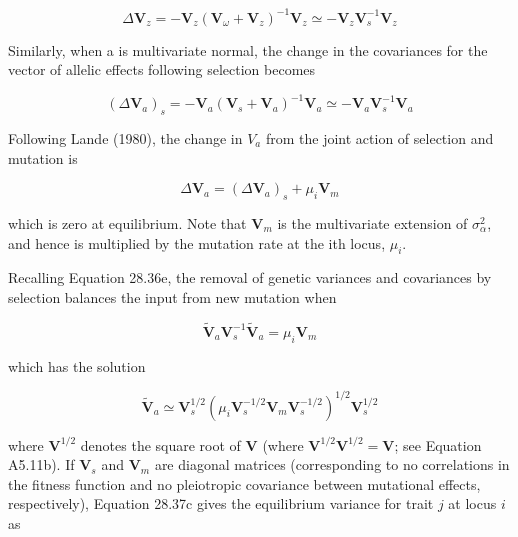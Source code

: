 \documentclass{article}
\begin{document}
\begin{equation}
\Delta\mathbf{V}_{z}=-\mathbf{V}_{z}(\mathbf{V}_{\omega}+\mathbf{V}_{z})^{-1}\mathbf{V}_{z}\simeq-\mathbf{V}_{z}\mathbf{V}_{s}^{-1}\mathbf{V}_{z}
\tag{28.36d}
\label{eq:28_36d}
\end{equation}

Similarly, when a is multivariate normal, the change in the covariances for the vector of allelic effects following selection becomes

\begin{equation}
\left(\Delta\mathbf{V}_{a}\right)_{s}=-\mathbf{V}_{a}\left(\mathbf{V}_{s}+\mathbf{V}_{a}\right)^{-1}\mathbf{V}_{a}\simeq-\mathbf{V}_{a}\mathbf{V}_{s}^{-1}\mathbf{V}_{a}
\tag{28.36e}
\label{eq:28_36e}
\end{equation}

Following Lande (1980), the change in  $ V_{a} $ from the joint action of selection and mutation is

\begin{equation}
\Delta\mathbf{V}_{a}=\left(\Delta\mathbf{V}_{a}\right)_{s}+\mu_{i}\mathbf{V}_{m}
\tag{28.37a}
\label{eq:28_37a}
\end{equation}

which is zero at equilibrium. Note that  $ \mathbf{V}_{m} $ is the multivariate extension of  $ \sigma_{\alpha}^{2} $, and hence is multiplied by the mutation rate at the ith locus,  $ \mu_{i} $.

Recalling Equation 28.36e, the removal of genetic variances and covariances by selection balances the input from new mutation when

\begin{equation}
\tilde{\mathbf{V}}_{a}\mathbf{V}_{s}^{-1}\tilde{\mathbf{V}}_{a}=\mu_{i}\mathbf{V}_{m}
\tag{28.37b}
\label{eq:28_37b}
\end{equation}

which has the solution

\begin{equation}
\tilde{\mathbf{V}}_{a}\simeq\mathbf{V}_{s}^{1/2}\left(\mu_{i}\mathbf{V}_{s}^{-1/2}\mathbf{V}_{m}\mathbf{V}_{s}^{-1/2}\right)^{1/2}\mathbf{V}_{s}^{1/2}
\tag{28.37c}
\label{eq:28_37c}
\end{equation}

where  $ \mathbf{V}^{1/2} $ denotes the square root of  $ \mathbf{V} $ (where  $ \mathbf{V}^{1/2}\mathbf{V}^{1/2} = \mathbf{V} $; see Equation A5.11b). If  $ \mathbf{V}_s $ and  $ \mathbf{V}_m $ are diagonal matrices (corresponding to no correlations in the fitness function and no pleiotropic covariance between mutational effects, respectively), Equation 28.37c gives the equilibrium variance for trait  $ j $ at locus  $ i $ as
\end{document}

